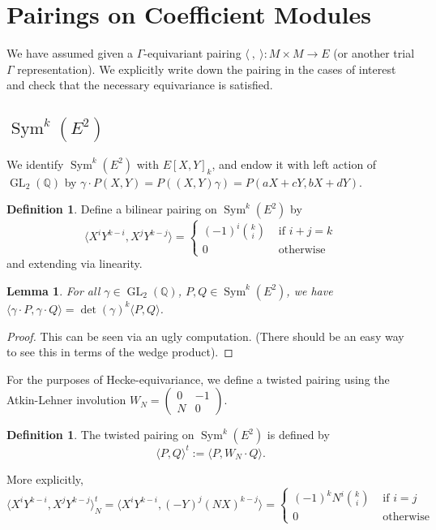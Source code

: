 \documentclass[10pt]{amsart}
\theoremstyle{plain}
\newtheorem{lemma}[theorem]{Lemma}
\theoremstyle{definition}
\newtheorem{definition}[theorem]{Definition}
\newcommand{\QQ}{{\mathbb{Q}}}
\DeclareMathOperator{\GL}{GL}
\DeclareMathOperator{\Sym}{Sym}
\begin{document}
\section{Pairings on Coefficient Modules} \label{sec:coeff_pairing}

We have assumed given a $\Gamma$-equivariant pairing $\langle~,~ \rangle : M \times M \longrightarrow E$ (or another trial $\Gamma$ representation). We explicitly write down the pairing in the cases of interest and check that the necessary equivariance is satisfied. 

\subsection{$\Sym^k(E^2)$}

We identify $\Sym^k(E^2)$ with $E[X,Y]_k$, and endow it with left action of $\GL_2(\QQ)$ by $\gamma \cdot P(X,Y) = P((X,Y)\gamma)=P(aX+cY,bX+dY).$ 
\begin{definition}
Define a bilinear pairing on $\Sym^k(E^2)$ by
\begin{equation*}
	\langle X^iY^{k-i}, X^j Y^{k-j} \rangle = \begin{cases} (-1)^i {k \choose i} & \text{ if } i+j=k\\
												0	& \text{ otherwise} \end{cases}
\end{equation*}
and extending via linearity.
\end{definition}


\begin{lemma}
For all $\gamma\in \GL_2(\QQ)$, $P,Q\in\Sym^k(E^2)$, we have $\langle \gamma\cdot P,\gamma \cdot Q\rangle = \det(\gamma)^k \langle P,Q\rangle$.
\end{lemma}
\begin{proof}
This can be seen via an ugly computation. (There should be an easy way to see this in terms of the wedge product).
\end{proof}

For the purposes of Hecke-equivariance, we define a twisted pairing using the Atkin-Lehner involution $W_N = \begin{pmatrix} 0 & -1 \\ N & 0 \end{pmatrix}$.
\begin{definition}
The twisted pairing on $\Sym^k(E^2)$ is defined by
\begin{equation}
	\langle P, Q\rangle^t := \langle P, W_N \cdot Q\rangle.
\end{equation}
\end{definition}
More explicitly,
\begin{equation*}
	\langle X^iY^{k-i}, X^j Y^{k-j} \rangle_N^t = \langle X^i Y^{k-i}, (-Y)^j(NX)^{k-j}\rangle= \begin{cases} (-1)^k N^i {k \choose i} & \text{ if } i=j\\
												0	& \text{ otherwise} \end{cases}
\end{equation*}
\end{document}
